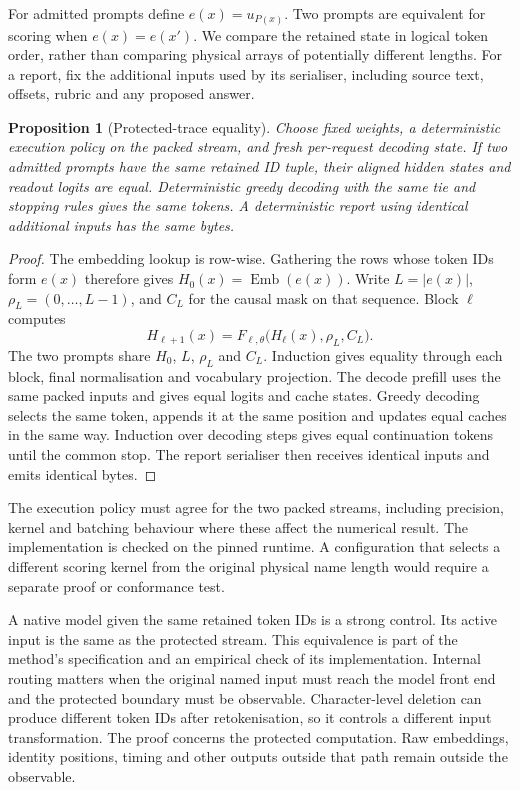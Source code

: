 \documentclass[11pt,a4paper]{article}
\newtheorem{proposition}{Proposition}
\newcommand{\E}{\operatorname{Emb}}
\begin{document}
For admitted prompts define \(e(x)=u_{P(x)}\). Two prompts are equivalent for scoring when \(e(x)=e(x')\). We compare the retained state in logical token order, rather than comparing physical arrays of potentially different lengths. For a report, fix the additional inputs used by its serialiser, including source text, offsets, rubric and any proposed answer.

\begin{proposition}[Protected-trace equality]
\label{prop:noninterference}
Choose fixed weights, a deterministic execution policy on the packed stream, and fresh per-request decoding state. If two admitted prompts have the same retained ID tuple, their aligned hidden states and readout logits are equal. Deterministic greedy decoding with the same tie and stopping rules gives the same tokens. A deterministic report using identical additional inputs has the same bytes.
\end{proposition}

\begin{proof}
The embedding lookup is row-wise. Gathering the rows whose token IDs form \(e(x)\) therefore gives \(H_0(x)=\E(e(x))\). Write \(L=|e(x)|\), \(\rho_L=(0,\ldots,L-1)\), and \(C_L\) for the causal mask on that sequence. Block \(\ell\) computes
\[
 H_{\ell+1}(x)=F_{\ell,\theta}\bigl(H_\ell(x),\rho_L,C_L\bigr).
\]
The two prompts share \(H_0\), \(L\), \(\rho_L\) and \(C_L\). Induction gives equality through each block, final normalisation and vocabulary projection. The decode prefill uses the same packed inputs and gives equal logits and cache states. Greedy decoding selects the same token, appends it at the same position and updates equal caches in the same way. Induction over decoding steps gives equal continuation tokens until the common stop. The report serialiser then receives identical inputs and emits identical bytes.
\end{proof}

The execution policy must agree for the two packed streams, including precision, kernel and batching behaviour where these affect the numerical result. The implementation is checked on the pinned runtime. A configuration that selects a different scoring kernel from the original physical name length would require a separate proof or conformance test.

A native model given the same retained token IDs is a strong control. Its active input is the same as the protected stream. This equivalence is part of the method's specification and an empirical check of its implementation. Internal routing matters when the original named input must reach the model front end and the protected boundary must be observable. Character-level deletion can produce different token IDs after retokenisation, so it controls a different input transformation. The proof concerns the protected computation. Raw embeddings, identity positions, timing and other outputs outside that path remain outside the observable.
\end{document}
